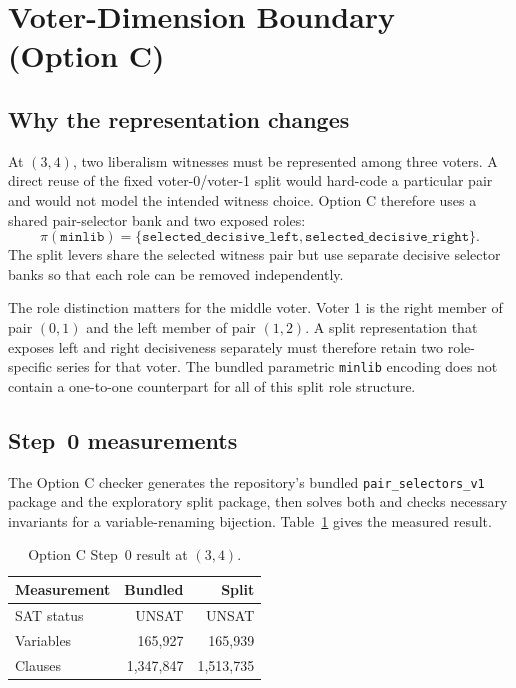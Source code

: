 \section{Voter-Dimension Boundary (Option C)}\label{sec:option-c}

\subsection{Why the representation changes}

At $(3,4)$, two liberalism witnesses must be represented among three voters.
A direct reuse of the fixed voter-0/voter-1 split would hard-code a particular
pair and would not model the intended witness choice.  Option C therefore uses
a shared pair-selector bank and two exposed roles:
\[
  \pi(\mathtt{minlib}) =
  \{\mathtt{selected\_decisive\_left},
    \mathtt{selected\_decisive\_right}\}.
\]
The split levers share the selected witness pair but use separate decisive
selector banks so that each role can be removed independently.

The role distinction matters for the middle voter.  Voter 1 is the right member
of pair $(0,1)$ and the left member of pair $(1,2)$.  A split representation
that exposes left and right decisiveness separately must therefore retain two
role-specific series for that voter.  The bundled parametric
\texttt{minlib} encoding does not contain a one-to-one counterpart for all of
this split role structure.

\subsection{Step~0 measurements}

The Option C checker generates the repository's bundled
\texttt{pair\_selectors\_v1} package and the exploratory split package, then
solves both and checks necessary invariants for a variable-renaming bijection.
Table~\ref{tab:option-c} gives the measured result.

\begin{table}[ht]
\centering
\caption{Option C Step~0 result at $(3,4)$.}\label{tab:option-c}
\begin{tabular}{lrr}
\toprule
Measurement & Bundled & Split \\
\midrule
SAT status & UNSAT & UNSAT \\
Variables & 165,927 & 165,939 \\
Clauses & 1,347,847 & 1,513,735 \\
\bottomrule
\end{tabular}
\end{table}

